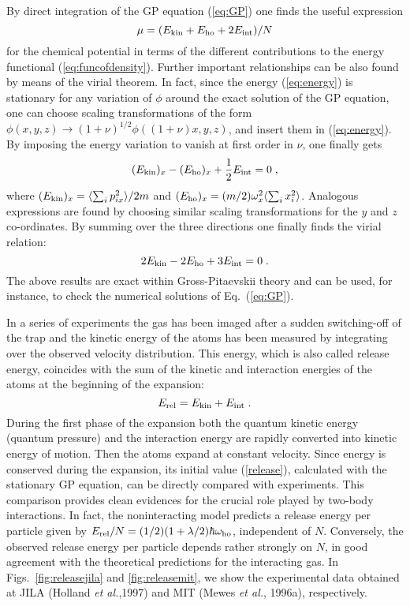 By direct integration of the GP equation (\ref{eq:GP}) one finds
the useful expression
\begin{equation}
\mu = ( E_{\rm kin} + E_{\rm ho} + 2 E_{\rm int} ) /N
\label{eq:newmu}
\end{equation}
for the chemical potential in terms of the different contributions
to the energy functional (\ref{eq:funcofdensity}). Further important
relationships can be also found by means of the virial theorem. In
fact, since the energy (\ref{eq:energy}) is stationary  for any variation
of $\phi$ around the exact solution of the GP equation, one can choose
scaling transformations of  the form $\phi(x,y,z) \to (1+\nu)^{1/2}
\phi ( (1+\nu)x, y,z)$, and  insert them in (\ref{eq:energy}).
By imposing the energy variation to vanish at first order
in $\nu$, one finally gets 
\begin{equation}
(E_{\rm kin})_x - (E_{\rm ho})_x + {1\over 2} E_{\rm int} = 0 \; ,      
\label{eq:virial}
\end{equation}
where $(E_{\rm kin})_x= \langle \sum_i p_{ix}^2 \rangle /2m$
and $(E_{\rm ho})_x= (m/ 2) \omega_x^2 \langle \sum_i x_i^2 \rangle$. 
Analogous expressions are found by choosing similar scaling 
transformations for the $y$ and $z$ co-ordinates. By summing over 
the three directions one finally finds the virial relation:
\begin{equation} 
2 E_{\rm kin} - 2 E_{\rm ho}+ 3 E_{\rm int}=0 \; .
\label{eq:virial1}
\end{equation}
The above results are exact  within  Gross-Pitaevskii theory and can 
be used, for instance, to check the numerical solutions of
Eq.~(\ref{eq:GP}).

In a series of experiments the gas has been imaged after a sudden
switching-off of the trap and the kinetic energy of the atoms has
been measured by integrating over the observed velocity distribution.
This energy, which is also called release energy, coincides with the
sum of the kinetic and interaction energies of the atoms at the
beginning of the expansion:
\begin{equation}
E_{\rm rel}=E_{\rm kin}+E_{\rm int} \; .
\label{release}
\end{equation}
During the first phase of the expansion both the quantum kinetic
energy (quantum pressure) and the interaction energy are rapidly 
converted into kinetic energy of motion. Then the atoms expand at 
constant velocity. Since energy is conserved during the expansion,
its initial value (\ref{release}), calculated with the stationary  
GP equation, can be directly compared with experiments. This 
comparison provides  clean evidences for the crucial role 
played by two-body interactions. In fact, the noninteracting model
predicts a release energy per particle given by $E_{\rm rel} /N = 
(1/2) (1+ \lambda/2) \hbar \omega_{\rm ho}$, independent of $N$. 
Conversely, the observed release energy per particle 
depends rather strongly on $N$, in good agreement with the 
theoretical predictions for the interacting gas. In 
Figs.~\ref{fig:releasejila} and \ref{fig:releasemit}, we show 
the experimental data obtained at JILA (Holland {\it et al.},1997) 
and MIT (Mewes {\it et al.}, 1996a), respectively. 

